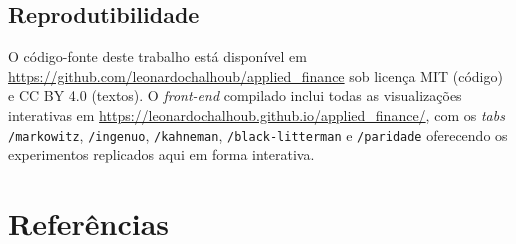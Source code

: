 \documentclass[12pt,a4paper,oneside]{article}
\begin{document}
\subsection*{Reprodutibilidade}

O código-fonte deste trabalho está disponível em
\url{https://github.com/leonardochalhoub/applied_finance} sob licença
MIT (código) e CC BY 4.0 (textos). O \textit{front-end} compilado
inclui todas as visualizações interativas em
\url{https://leonardochalhoub.github.io/applied_finance/}, com os
\textit{tabs} \texttt{/markowitz}, \texttt{/ingenuo}, \texttt{/kahneman},
\texttt{/black-litterman} e \texttt{/paridade} oferecendo os
experimentos replicados aqui em forma interativa.

\section*{Referências}
\end{document}
